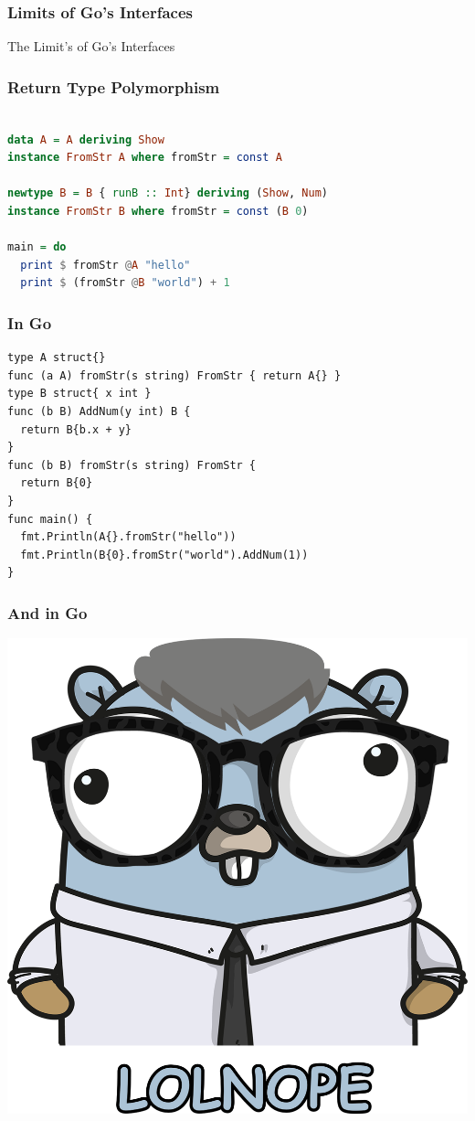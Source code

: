 \documentclass{beamer}
\newcommand{\hugecenter}[1]{\begin{center}\begin{huge}#1\end{huge}\end{center}}
\begin{document}
\begin{frame}
  \frametitle{Limits of Go's Interfaces}
  \hugecenter{The Limit's of Go's Interfaces}
\end{frame}

\begin{frame}[fragile]
  \frametitle{Return Type Polymorphism}
\begin{lstlisting}[language=Haskell]
% class FromStr a where fromStr :: String -> a

data A = A deriving Show
instance FromStr A where fromStr = const A

newtype B = B { runB :: Int} deriving (Show, Num)
instance FromStr B where fromStr = const (B 0)

main = do
  print $ fromStr @A "hello"
  print $ (fromStr @B "world") + 1
\end{lstlisting}
\end{frame}

\begin{frame}[fragile]
  \frametitle{In Go}
\begin{lstlisting}[language=Golang]
% type FromStr interface {fromStr(string) FromStr}
type A struct{}
func (a A) fromStr(s string) FromStr { return A{} }
type B struct{ x int }
func (b B) AddNum(y int) B {
  return B{b.x + y}
}
func (b B) fromStr(s string) FromStr {
  return B{0}
}
func main() {
  fmt.Println(A{}.fromStr("hello"))
  fmt.Println(B{0}.fromStr("world").AddNum(1))
}
\end{lstlisting}
\end{frame}

\begin{frame}
  \frametitle{And in Go}
  \begin{center}
    \includegraphics[height=.8\paperheight]{img/nopher}
  \end{center}
\end{frame}
\end{document}
